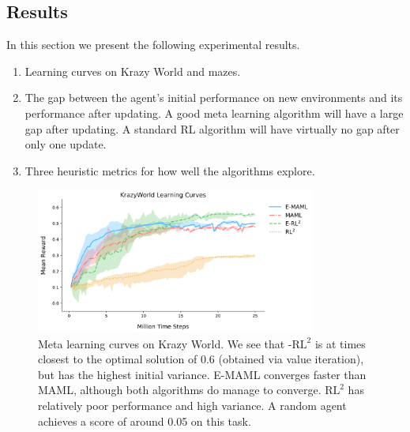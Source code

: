 \documentclass{article} %
\begin{document}

    
\subsection{Results} 
In this section we present the following experimental results. 
\begin{enumerate} 
\item Learning curves on Krazy World and mazes.
\item The gap between the agent's initial performance on new environments and its performance after updating. A good meta learning algorithm will have a large gap after updating. A standard RL algorithm will have virtually no gap after only one update. 
\item Three heuristic metrics for how well the algorithms explore. 
\end{enumerate}

\begin{figure}[ht]
\begin{center}
\includegraphics[width=0.82\textwidth]{ge_curves/KrazyWorld-Learning_Curves.png} 
\end{center}
\caption{Meta learning curves on Krazy World. We see that -$\text{RL}^2$ is at times closest to the optimal solution of 0.6 (obtained via value iteration), but has the highest initial variance. E-MAML converges faster than MAML, although both algorithms do manage to converge. $\text{RL}^2$ has relatively poor performance and high variance. A random agent achieves a score of around 0.05 on this task.}
\label{fig:learning-curves-0}
\end{figure} 
\end{document}
